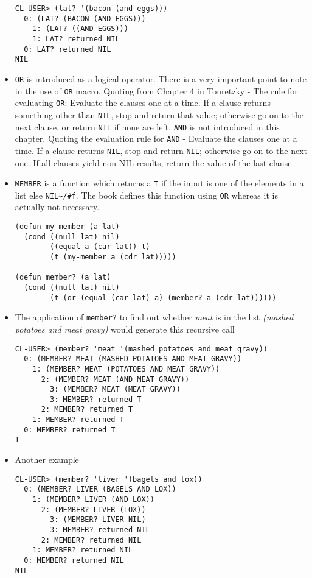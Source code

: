 \documentclass[11pt]{article}
\begin{document}
\begin{itemize}
\begin{verbatim}
\end{verbatim}

\begin{verbatim}
CL-USER> (lat? '(bacon (and eggs)))
  0: (LAT? (BACON (AND EGGS)))
    1: (LAT? ((AND EGGS)))
    1: LAT? returned NIL
  0: LAT? returned NIL
NIL

\end{verbatim}
\item \texttt{OR} is introduced as a logical operator. There is a very important point to note in the use of \texttt{OR} macro. Quoting
from Chapter 4 in Touretzky - The rule for evaluating \texttt{OR}: Evaluate the clauses one at a time. If a clause
returns something other than \texttt{NIL}, stop and return that value; otherwise go on to the next clause, or return
\texttt{NIL} if none are left. \texttt{AND} is not introduced in this chapter. Quoting the evaluation rule for \texttt{AND} - Evaluate
the clauses one at a time. If a clause returns \texttt{NIL}, stop and return \texttt{NIL}; otherwise go on to the next one. If all
clauses yield non-NIL results, return the value of the last clause.
\item \texttt{MEMBER} is a function which returns a \texttt{T} if the input is one of the elements in a list else \texttt{NIL\textasciitilde{}/\#f}. The book
defines this function using \texttt{OR} whereas it is actually not necessary.
\begin{verbatim}
(defun my-member (a lat)
  (cond ((null lat) nil)
        ((equal a (car lat)) t)
        (t (my-member a (cdr lat)))))

(defun member? (a lat)
  (cond ((null lat) nil)
        (t (or (equal (car lat) a) (member? a (cdr lat))))))

\end{verbatim}
\item The application of \texttt{member?} to find out whether \emph{meat} is in the list \emph{(mashed potatoes and meat gravy)} would
generate this recursive call
\begin{verbatim}
CL-USER> (member? 'meat '(mashed potatoes and meat gravy))
  0: (MEMBER? MEAT (MASHED POTATOES AND MEAT GRAVY))
    1: (MEMBER? MEAT (POTATOES AND MEAT GRAVY))
      2: (MEMBER? MEAT (AND MEAT GRAVY))
        3: (MEMBER? MEAT (MEAT GRAVY))
        3: MEMBER? returned T
      2: MEMBER? returned T
    1: MEMBER? returned T
  0: MEMBER? returned T
T

\end{verbatim}
\item Another example
\begin{verbatim}
CL-USER> (member? 'liver '(bagels and lox))
  0: (MEMBER? LIVER (BAGELS AND LOX))
    1: (MEMBER? LIVER (AND LOX))
      2: (MEMBER? LIVER (LOX))
        3: (MEMBER? LIVER NIL)
        3: MEMBER? returned NIL
      2: MEMBER? returned NIL
    1: MEMBER? returned NIL
  0: MEMBER? returned NIL
NIL

\end{verbatim}
\end{itemize}
\end{document}
